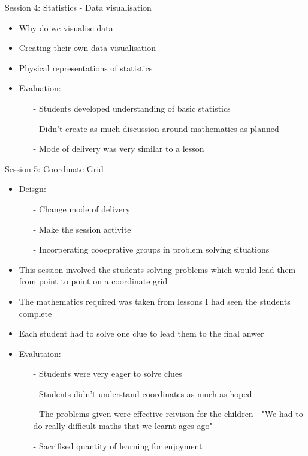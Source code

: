 \documentclass{beamer}  %
\begin{document}
\begin{frame}{Session 4: Statistics - Data visualisation}
    \begin{itemize}
        \item Why do we visualise data
        \item Creating their own data visualisation
        \item Physical representations of statistics
        \pause
        \item Evaluation:
        \begin{itemize}
            \item[-] Students developed understanding of basic statistics
            \item[-] Didn't create as much discussion around mathematics as planned
            \item[-] Mode of delivery was very similar to a lesson 
        \end{itemize}
    \end{itemize}
\end{frame}

\begin{frame}{Session 5: Coordinate Grid}
    \begin{itemize}
        \item Deisgn:
        \begin{itemize}
            \item[-] Change mode of delivery
            \item[-] Make the session activite
            \item[-] Incorperating cooeprative groups in problem solving situations 
        \end{itemize}
        \item This session involved the students solving problems which would lead them from point to point on a coordinate grid
        \item The mathematics required was taken from lessons I had seen the students complete
        \item Each student had to solve one clue to lead them to the final anwer
        \item Evalutaion:
        \begin{itemize}
            \item[-] Students were very eager to solve clues
            \item[-] Students didn't understand coordinates as much as hoped
            \item[-] The problems given were effective reivison for the children - "We had to do really difficult maths that we learnt ages ago"
            \item[-] Sacrifised quantity of learning for enjoyment
        \end{itemize}
    \end{itemize}
\end{frame}
\end{document}
